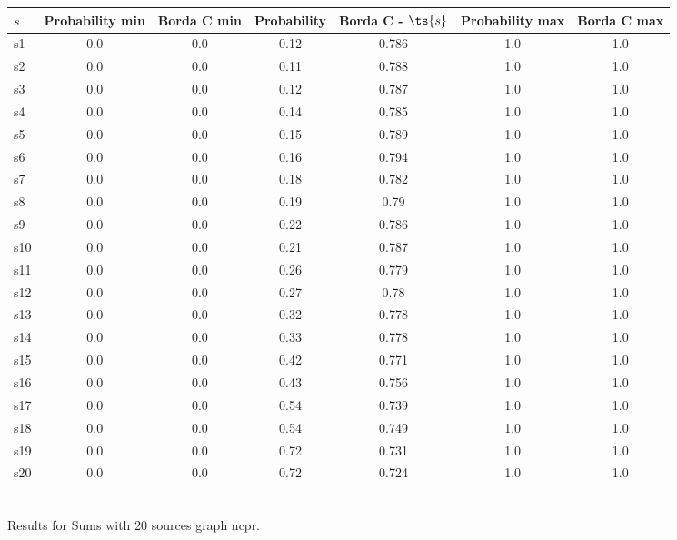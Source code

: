 \documentclass{article}
\begin{document}
\noindent\begin{tabular}{|l|c|c|c|c|c|c|}
\hline
$s$& Probability min & Borda C min & Probability & Borda C - $\ts{s}$ & Probability max & Borda C max\\
\hline
s1 &0.0 & 0.0 & 0.12 & 0.786 & 1.0 & 1.0\\
\hline
s2 &0.0 & 0.0 & 0.11 & 0.788 & 1.0 & 1.0\\
\hline
s3 &0.0 & 0.0 & 0.12 & 0.787 & 1.0 & 1.0\\
\hline
s4 &0.0 & 0.0 & 0.14 & 0.785 & 1.0 & 1.0\\
\hline
s5 &0.0 & 0.0 & 0.15 & 0.789 & 1.0 & 1.0\\
\hline
s6 &0.0 & 0.0 & 0.16 & 0.794 & 1.0 & 1.0\\
\hline
s7 &0.0 & 0.0 & 0.18 & 0.782 & 1.0 & 1.0\\
\hline
s8 &0.0 & 0.0 & 0.19 & 0.79 & 1.0 & 1.0\\
\hline
s9 &0.0 & 0.0 & 0.22 & 0.786 & 1.0 & 1.0\\
\hline
s10 &0.0 & 0.0 & 0.21 & 0.787 & 1.0 & 1.0\\
\hline
s11 &0.0 & 0.0 & 0.26 & 0.779 & 1.0 & 1.0\\
\hline
s12 &0.0 & 0.0 & 0.27 & 0.78 & 1.0 & 1.0\\
\hline
s13 &0.0 & 0.0 & 0.32 & 0.778 & 1.0 & 1.0\\
\hline
s14 &0.0 & 0.0 & 0.33 & 0.778 & 1.0 & 1.0\\
\hline
s15 &0.0 & 0.0 & 0.42 & 0.771 & 1.0 & 1.0\\
\hline
s16 &0.0 & 0.0 & 0.43 & 0.756 & 1.0 & 1.0\\
\hline
s17 &0.0 & 0.0 & 0.54 & 0.739 & 1.0 & 1.0\\
\hline
s18 &0.0 & 0.0 & 0.54 & 0.749 & 1.0 & 1.0\\
\hline
s19 &0.0 & 0.0 & 0.72 & 0.731 & 1.0 & 1.0\\
\hline
s20 &0.0 & 0.0 & 0.72 & 0.724 & 1.0 & 1.0\\
\hline
\end{tabular}\\

\noindent Results for Sums with 20 sources graph ncpr.
\end{document}
